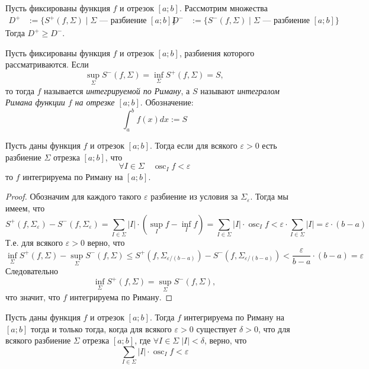 \documentclass[12pt,a4paper]{article}
\DeclareMathOperator*{\osc}{osc}
\begin{document}
    \begin{corollary}
        Пусть фиксированы функция $f$ и отрезок $[a; b]$. Рассмотрим множества
        \begin{align*}
            D^+ &:= \{S^+(f, \Sigma) \mid \text{$\Sigma$ --- разбиение $[a; b]$}\}&
            D^- &:= \{S^-(f, \Sigma) \mid \text{$\Sigma$ --- разбиение $[a; b]$}\}
        \end{align*}
        Тогда $D^+ \geqslant D^-$.
    \end{corollary}

    \begin{definition}
        Пусть фиксированы функция $f$ и отрезок $[a; b]$, разбиения которого рассматриваются. Если
        \[\sup_{\Sigma} S^-(f, \Sigma) = \inf_{\Sigma} S^+(f, \Sigma) = S,\]
        то тогда $f$ называется \emph{интегрируемой по Риману}, а $S$ называют \emph{интегралом Римана функции $f$ на отрезке $[a;b]$}. Обозначение:
        \[\int_a^b f(x) dx := S\]
    \end{definition}

    \begin{lemma}
        Пусть даны функция $f$ и отрезок $[a; b]$. Тогда если для всякого $\varepsilon > 0$ есть разбиение $\Sigma$ отрезка $[a; b]$, что
        \[\forall I \in \Sigma\quad \osc_I f < \varepsilon\]
        то $f$ интегрируема по Риману на $[a; b]$.
    \end{lemma}

    \begin{proof}
        Обозначим для каждого такого $\varepsilon$ разбиение из условия за $\Sigma_\varepsilon$. Тогда мы имеем, что
        \[
            S^+(f, \Sigma_\varepsilon) - S^-(f, \Sigma_\varepsilon)
            = \sum_{I \in \Sigma} |I| \cdot (\sup_I f - \inf_I f)
            = \sum_{I \in \Sigma} |I| \cdot \osc_I f
            < \varepsilon \cdot \sum_{I \in \Sigma} |I|
            = \varepsilon \cdot (b - a)
        \]
        Т.е. для всякого $\varepsilon > 0$ верно, что
        \[
            \inf_{\Sigma} S^+(f, \Sigma) - \sup_{\Sigma} S^-(f, \Sigma)
            \leqslant S^+(f, \Sigma_{\varepsilon / (b - a)}) - S^-(f, \Sigma_{\varepsilon / (b - a)})
            < \frac{\varepsilon}{b - a} \cdot (b - a)
            = \varepsilon
        \]
        Следовательно
        \[\inf_{\Sigma} S^+(f, \Sigma) = \sup_{\Sigma} S^-(f, \Sigma),\]
        что значит, что $f$ интегрируема по Риману.
    \end{proof}

    \begin{lemma}
        Пусть даны функция $f$ и отрезок $[a; b]$. Тогда $f$ интегрируема по Риману на $[a; b]$ тогда и только тогда, когда для всякого $\varepsilon > 0$ существует $\delta > 0$, что для всякого разбиение $\Sigma$ отрезка $[a; b]$, где $\forall I \in \Sigma\; |I| < \delta$, верно, что
        \[\sum_{I \in \Sigma} |I| \cdot \osc_I f < \varepsilon\]
    \end{lemma}
\end{document}
